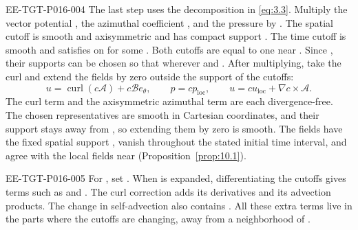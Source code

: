 \begin{EESegment}{EE-TGT-P016-004}
The last step uses the decomposition in \eqref{eq:3.3}. Multiply the vector potential
, the azimuthal coefficient
, and the pressure
 by . The spatial
cutoff  is smooth and axisymmetric and has compact support
. The time cutoff  is smooth and
satisfies  on  for some
. Both cutoffs are equal to one near
. Since , their
supports can be chosen so that  wherever
 and . After multiplying, take the curl
and extend the fields by zero outside the support of the cutoffs:
\[
u=\operatorname{curl}(c\mathcal A)+c\mathcal B e_\theta,
\qquad p=cp_{\mathrm{loc}},
\qquad
u=cu_{\mathrm{loc}}+\nabla c\times\mathcal A.
\]
The curl term and the axisymmetric azimuthal term are each divergence-free. The chosen
representatives are smooth in Cartesian coordinates, and their support stays away from
, so extending them by zero is smooth. The fields
 have the fixed spatial support
, vanish throughout the stated initial time interval, and
agree with the local fields near 
(Proposition~\ref{prop:10.1}).
\end{EESegment}

\begin{EESegment}{EE-TGT-P016-005}
For , set . When
 is expanded,
differentiating the cutoffs gives terms such as
 and
. The curl correction
 adds its derivatives and its advection
products. The change in self-advection also contains
. All
these extra terms live in the parts where the cutoffs are changing, away from a neighborhood
of .
\end{EESegment}

